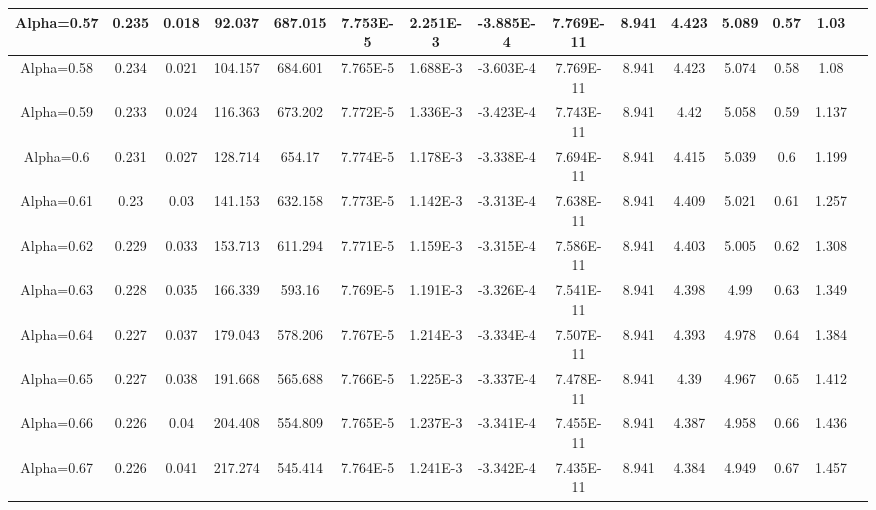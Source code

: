 \documentclass[preview]{standalone}
\begin{document}
\begin{center}
\begin{tabular}{|c|c|c|c|c|c|c|c|c|c|c|c|c|c|c|}
\hline
Alpha=0.57 & 0.235 & 0.018 & 92.037 & 687.015 & 7.753E-5 & 2.251E-3 & -3.885E-4 & 7.769E-11 & 8.941 & 4.423 & 5.089 & 0.57 & 1.03\\
\hline
Alpha=0.58 & 0.234 & 0.021 & 104.157 & 684.601 & 7.765E-5 & 1.688E-3 & -3.603E-4 & 7.769E-11 & 8.941 & 4.423 & 5.074 & 0.58 & 1.08\\
\hline
Alpha=0.59 & 0.233 & 0.024 & 116.363 & 673.202 & 7.772E-5 & 1.336E-3 & -3.423E-4 & 7.743E-11 & 8.941 & 4.42 & 5.058 & 0.59 & 1.137\\
\hline
Alpha=0.6 & 0.231 & 0.027 & 128.714 & 654.17 & 7.774E-5 & 1.178E-3 & -3.338E-4 & 7.694E-11 & 8.941 & 4.415 & 5.039 & 0.6 & 1.199\\
\hline
Alpha=0.61 & 0.23 & 0.03 & 141.153 & 632.158 & 7.773E-5 & 1.142E-3 & -3.313E-4 & 7.638E-11 & 8.941 & 4.409 & 5.021 & 0.61 & 1.257\\
\hline
Alpha=0.62 & 0.229 & 0.033 & 153.713 & 611.294 & 7.771E-5 & 1.159E-3 & -3.315E-4 & 7.586E-11 & 8.941 & 4.403 & 5.005 & 0.62 & 1.308\\
\hline
Alpha=0.63 & 0.228 & 0.035 & 166.339 & 593.16 & 7.769E-5 & 1.191E-3 & -3.326E-4 & 7.541E-11 & 8.941 & 4.398 & 4.99 & 0.63 & 1.349\\
\hline
Alpha=0.64 & 0.227 & 0.037 & 179.043 & 578.206 & 7.767E-5 & 1.214E-3 & -3.334E-4 & 7.507E-11 & 8.941 & 4.393 & 4.978 & 0.64 & 1.384\\
\hline
Alpha=0.65 & 0.227 & 0.038 & 191.668 & 565.688 & 7.766E-5 & 1.225E-3 & -3.337E-4 & 7.478E-11 & 8.941 & 4.39 & 4.967 & 0.65 & 1.412\\
\hline
Alpha=0.66 & 0.226 & 0.04 & 204.408 & 554.809 & 7.765E-5 & 1.237E-3 & -3.341E-4 & 7.455E-11 & 8.941 & 4.387 & 4.958 & 0.66 & 1.436\\
\hline
Alpha=0.67 & 0.226 & 0.041 & 217.274 & 545.414 & 7.764E-5 & 1.241E-3 & -3.342E-4 & 7.435E-11 & 8.941 & 4.384 & 4.949 & 0.67 & 1.457\\
\hline
\end{tabular}
\end{center}
\end{document}
